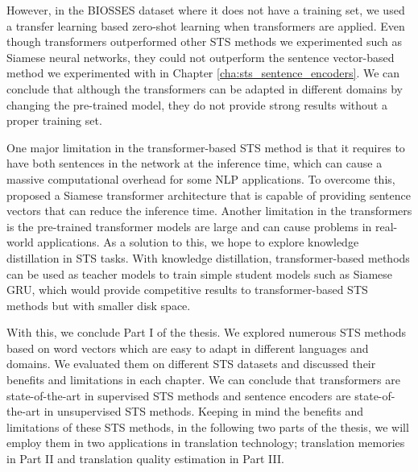 However, in the BIOSSES dataset where it does not have a training set, we used a transfer learning based zero-shot learning when transformers are applied. Even though transformers outperformed other STS methods we experimented such as Siamese neural networks, they could not outperform the sentence vector-based method we experimented with in Chapter \ref{cha:sts_sentence_encoders}. We can conclude that although the transformers can be adapted in different domains by changing the pre-trained model, they do not provide strong results without a proper training set. 

One major limitation in the transformer-based STS method is that it requires to have both sentences in the network at the inference time, which can cause a massive computational overhead for some NLP applications. To overcome this, \textcite{reimers-gurevych-2019-sentence} proposed a Siamese transformer architecture that is capable of providing sentence vectors that can reduce the inference time. Another limitation in the transformers is the pre-trained transformer models are large and can cause problems in real-world applications. As a solution to this, we hope to explore knowledge distillation \autocite{Gou2021} in STS tasks. With knowledge distillation, transformer-based methods can be used as teacher models to train simple student models such as Siamese GRU, which would provide competitive results to transformer-based STS methods but with smaller disk space. 

With this, we conclude Part I of the thesis. We explored numerous STS methods based on word vectors which are easy to adapt in different languages and domains. We evaluated them on different STS datasets and discussed their benefits and limitations in each chapter. We can conclude that transformers are state-of-the-art in supervised STS methods and sentence encoders are state-of-the-art in unsupervised STS methods. Keeping in mind the benefits and limitations of these STS methods, in the following two parts of the thesis, we will employ them in two applications in translation technology; translation memories in Part II and translation quality estimation in Part III.

